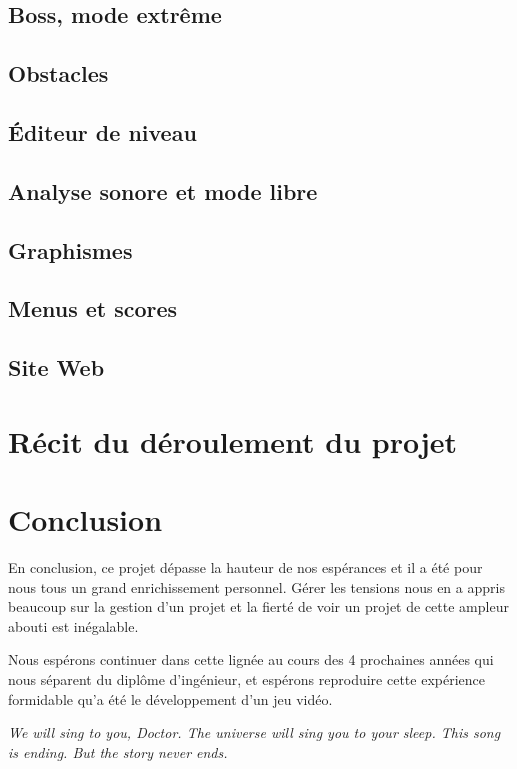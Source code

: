 \documentclass[12pt,a4paper]{article}
\begin{document}
		\subsection{Boss, mode extrême}
			
		\subsection{Obstacles}
			
		\subsection{Éditeur de niveau}
			
		\subsection{Analyse sonore et mode libre}
			
		\subsection{Graphismes}
			
		\subsection{Menus et scores}
			
		\subsection{Site Web}
			
	
	\newpage
	\section{Récit du déroulement du projet}
		
	
	\newpage
	\section{Conclusion}
		\par En conclusion, ce projet dépasse la hauteur de nos espérances et il a été pour nous tous un grand enrichissement personnel. Gérer les tensions nous en a appris beaucoup sur la gestion d'un projet et la fierté de voir un projet de cette ampleur abouti est inégalable.
		\par Nous espérons continuer dans cette lignée au cours des 4 prochaines années qui nous séparent du diplôme d'ingénieur, et espérons reproduire cette expérience formidable qu'a été le développement d'un jeu vidéo.
		\vspace{2cm}		
		\par \emph{We will sing to you, Doctor. The universe will sing you to your sleep. This song is ending. But the story never ends.}
\end{document}
